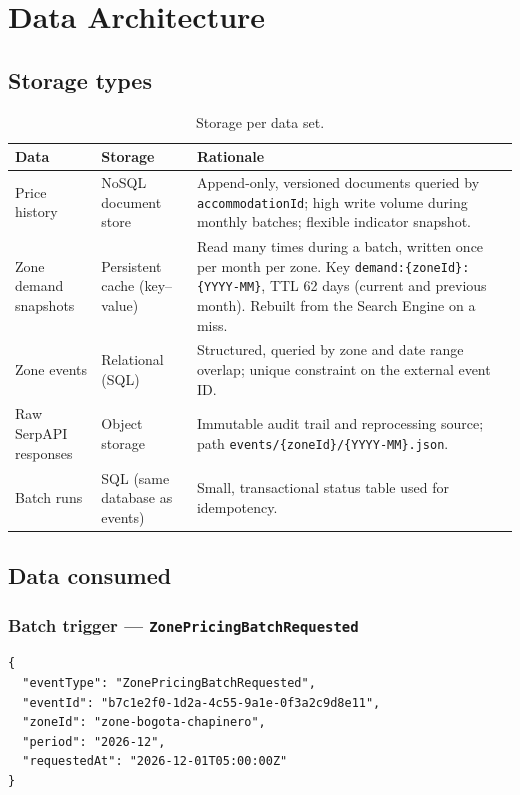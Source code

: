 \documentclass[11pt,a4paper]{article}
\begin{document}
\section{Data Architecture}
\label{sec:data}

\subsection{Storage types}
\begin{table}[H]
  \centering
  \begin{tabularx}{\textwidth}{@{}>{\raggedright\arraybackslash}p{3.2cm}>{\raggedright\arraybackslash}p{3.6cm}>{\raggedright\arraybackslash}X@{}}
    \toprule
    \textbf{Data} & \textbf{Storage} & \textbf{Rationale} \\
    \midrule
    Price history & NoSQL document store & Append-only, versioned documents
      queried by \texttt{accommodationId}; high write volume during monthly
      batches; flexible indicator snapshot. \\
    Zone demand snapshots & Persistent cache (key--value) &
      Read many times during a batch, written once per month per zone.
      Key \texttt{demand:\{zoneId\}:\{YYYY-MM\}}, TTL 62 days (current and
      previous month). Rebuilt from the Search Engine on a miss. \\
    Zone events & Relational (SQL) & Structured, queried by zone and date
      range overlap; unique constraint on the external event ID. \\
    Raw SerpAPI responses & Object storage & Immutable audit trail and
      reprocessing source; path \texttt{events/\{zoneId\}/\{YYYY-MM\}.json}. \\
    Batch runs & SQL (same database as events) & Small, transactional
      status table used for idempotency. \\
    \bottomrule
  \end{tabularx}
  \caption{Storage per data set.}
\end{table}

\subsection{Data consumed}

\subsubsection{Batch trigger --- \texttt{ZonePricingBatchRequested}}
\begin{lstlisting}
{
  "eventType": "ZonePricingBatchRequested",
  "eventId": "b7c1e2f0-1d2a-4c55-9a1e-0f3a2c9d8e11",
  "zoneId": "zone-bogota-chapinero",
  "period": "2026-12",
  "requestedAt": "2026-12-01T05:00:00Z"
}
\end{lstlisting}
\end{document}
